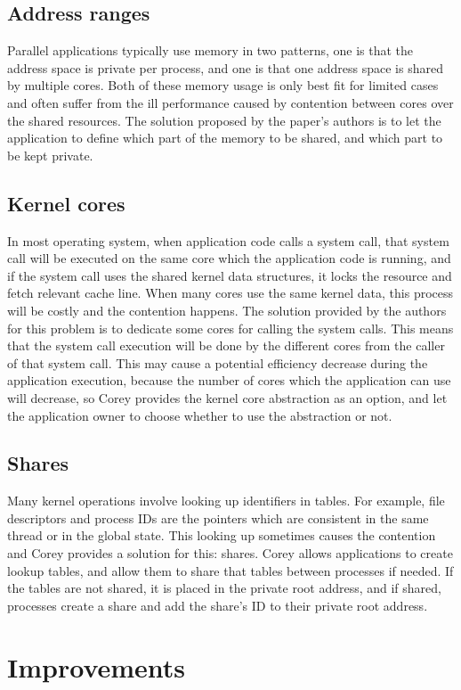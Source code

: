 \documentclass[10pt,a4paper]{ltjsarticle}       %
\begin{document}
\subsection{Address ranges}
Parallel applications typically use memory in two patterns, one is that the address space is private per process, and one is that one address space is shared by multiple cores. Both of these memory usage is only best fit for limited cases and often suffer from the ill performance caused by contention between cores over the shared resources.
The solution proposed by the paper's authors is to let the application to define which part of the memory to be shared, and which part to be kept private.
\subsection{Kernel cores}
In most operating system, when application code calls a system call, that system call will be executed on the same core which the application code is running, and if the system call uses the shared kernel data structures, it locks the resource and fetch relevant cache line. When many cores use the same kernel data, this process will be costly and the contention happens. The solution provided by the authors for this problem is to dedicate some cores for calling the system calls. This means that the system call execution will be done by the different cores from the caller of that system call. This may cause a potential efficiency decrease during the application execution, because the number of cores which the application can use will decrease, so Corey provides the kernel core abstraction as an option, and let the application owner to choose whether to use the abstraction or not.
\subsection{Shares}
Many kernel operations involve looking up identifiers in tables. For example, file descriptors and process IDs are the pointers which are consistent in the same thread or in the global state. This looking up sometimes causes the contention and Corey provides a solution for this: shares. Corey allows applications to create lookup tables, and allow them to share that tables between processes if needed. If the tables are not shared, it is placed in the private root address, and  if shared, processes create a share and add the share's ID to their private root address.
\section{Improvements}
\end{document}
